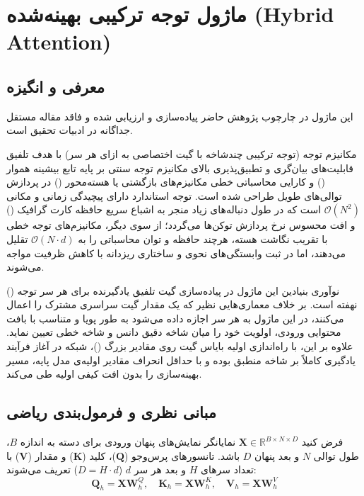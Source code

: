 \section{ماژول توجه ترکیبی بهینه‌شده (Hybrid Attention)}
\label{sec:module_hybrid_attention}

\subsection{معرفی و انگیزه}
این ماژول در چارچوب پژوهش حاضر پیاده‌سازی و ارزیابی شده و فاقد مقاله مستقل جداگانه در ادبیات تحقیق است.

مکانیزم توجه  (توجه ترکیبی چندشاخه با گیت اختصاصی به ازای هر سر) با هدف تلفیق قابلیت‌های بیان‌گری و تطبیق‌پذیری بالای مکانیزم توجه سنتی بر پایه تابع بیشینه هموار () و کارایی محاسباتی خطی مکانیزم‌های بازگشتی یا هسته‌محور () در پردازش توالی‌های طویل طراحی شده است. توجه استاندارد دارای پیچیدگی زمانی و مکانی $\mathcal{O}(N^2)$ است که در طول دنباله‌های زیاد منجر به اشباع سریع حافظه کارت گرافیک () و افت محسوس نرخ پردازش توکن‌ها می‌گردد؛ از سوی دیگر، مکانیزم‌های توجه خطی با تقریب نگاشت هسته، هرچند حافظه و توان محاسباتی را به $\mathcal{O}(N \cdot d)$ تقلیل می‌دهند، اما در ثبت وابستگی‌های نحوی و ساختاری ریزدانه با کاهش ظرفیت مواجه می‌شوند.

نوآوری بنیادین این ماژول در پیاده‌سازی گیت تلفیق یادگیرنده برای هر سر توجه () نهفته است. بر خلاف معماری‌هایی نظیر  که یک مقدار گیت سراسری مشترک را اعمال می‌کنند، در این ماژول به هر سر اجازه داده می‌شود به طور پویا و متناسب با بافت محتوایی ورودی، اولویت خود را میان شاخه دقیق دانس و شاخه خطی تعیین نماید. علاوه بر این، با راه‌اندازی اولیه بایاس گیت روی مقادیر بزرگ ()، شبکه در آغاز فرآیند یادگیری کاملاً بر شاخه  منطبق بوده و با حداقل انحراف مقادیر اولیه‌ی مدل پایه، مسیر بهینه‌سازی را بدون افت کیفی اولیه طی می‌کند.

\subsection{مبانی نظری و فرمول‌بندی ریاضی}
فرض کنید $\mathbf{X} \in \mathbb{R}^{B \times N \times D}$ نمایانگر نمایش‌های پنهان ورودی برای دسته به اندازه $B$، طول توالی $N$ و بعد پنهان $D$ باشد. تانسورهای پرس‌وجو ($\mathbf{Q}$)، کلید ($\mathbf{K}$) و مقدار ($\mathbf{V}$) با تعداد سرهای $H$ و بعد هر سر $d$ ($D = H \cdot d$) تعریف می‌شوند:
\begin{equation}
\mathbf{Q}_h = \mathbf{X} \mathbf{W}_h^Q, \quad \mathbf{K}_h = \mathbf{X} \mathbf{W}_h^K, \quad \mathbf{V}_h = \mathbf{X} \mathbf{W}_h^V
\end{equation}

